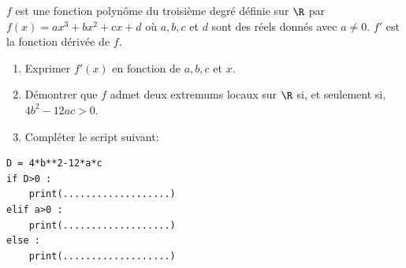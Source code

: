 \documentclass[a4paper,11pt,exos]{nsi} %
\begin{document}
\exo{}
\begin{multicols}{2}
	$f$ est une fonction polynôme du troisième degré définie sur $\R$ par $f(x)=ax^3+bx^2+cx+d$ où $a,b,c$ et $d$ sont des réels donnés avec $a\neq 0$. $f'$ est la fonction dérivée de $f$.
	\begin{enumerate}
		\item 	Exprimer $f'(x)$ en fonction de $a,b,c$ et $x$.
		\item 	Démontrer que $f$ admet deux extremums locaux sur $\R$ si, et seulement si, $4b^2-12ac>0$.
		\item	Compléter le script suivant:
	\end{enumerate}	
\begin{pyc}
    \begin{verbatim}
D = 4*b**2-12*a*c
if D>0 :
    print(...................)
elif a>0 :
    print(...................)
else :
    print(...................)        
    \end{verbatim}
\end{pyc}


\end{multicols}
\end{document}
